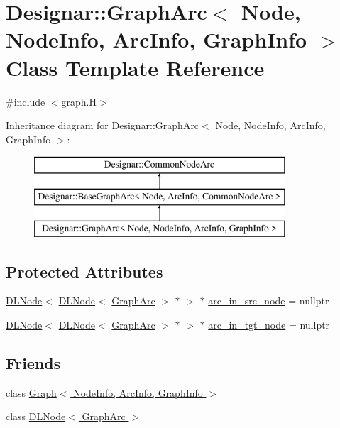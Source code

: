 \hypertarget{class_designar_1_1_graph_arc}{}\section{Designar\+:\+:Graph\+Arc$<$ Node, Node\+Info, Arc\+Info, Graph\+Info $>$ Class Template Reference}
\label{class_designar_1_1_graph_arc}


{\ttfamily \#include $<$graph.\+H$>$}

Inheritance diagram for Designar\+:\+:Graph\+Arc$<$ Node, Node\+Info, Arc\+Info, Graph\+Info $>$\+:\begin{figure}[H]
\begin{center}
\leavevmode
\includegraphics[height=3.000000cm]{class_designar_1_1_graph_arc}
\end{center}
\end{figure}
\subsection*{Protected Attributes}
\begin{DoxyCompactItemize}
\item 
\hyperlink{class_designar_1_1_d_l_node}{D\+L\+Node}$<$ \hyperlink{class_designar_1_1_d_l_node}{D\+L\+Node}$<$ \hyperlink{class_designar_1_1_graph_arc}{Graph\+Arc} $>$ $\ast$ $>$ $\ast$ \hyperlink{class_designar_1_1_graph_arc_addbd9ebec2787d3950aa679acf392fc6}{arc\+\_\+in\+\_\+src\+\_\+node} = nullptr
\item 
\hyperlink{class_designar_1_1_d_l_node}{D\+L\+Node}$<$ \hyperlink{class_designar_1_1_d_l_node}{D\+L\+Node}$<$ \hyperlink{class_designar_1_1_graph_arc}{Graph\+Arc} $>$ $\ast$ $>$ $\ast$ \hyperlink{class_designar_1_1_graph_arc_a49385be5572e3c6dd2d22309ef5fd79a}{arc\+\_\+in\+\_\+tgt\+\_\+node} = nullptr
\end{DoxyCompactItemize}
\subsection*{Friends}
\begin{DoxyCompactItemize}
\item 
class \hyperlink{class_designar_1_1_graph_arc_a0a9834688687d864501bbb9c85b0d32c}{Graph$<$ Node\+Info, Arc\+Info, Graph\+Info $>$}
\item 
class \hyperlink{class_designar_1_1_graph_arc_a94936ca2e45f109cf3805a93858fbc75}{D\+L\+Node$<$ Graph\+Arc $>$}
\end{DoxyCompactItemize}
